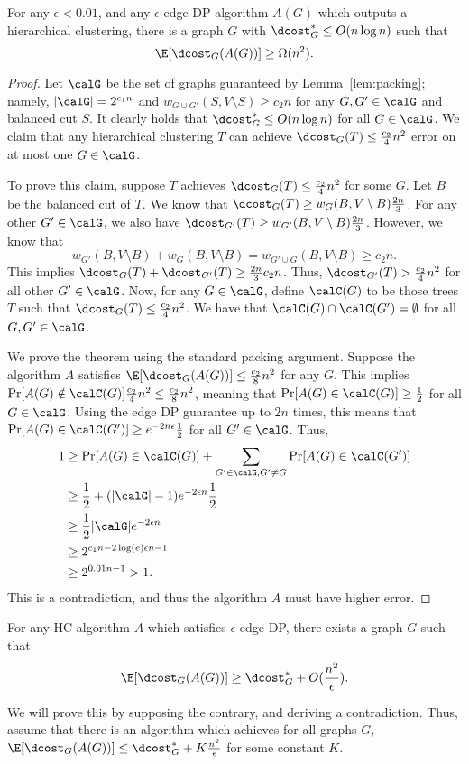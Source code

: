 \begin{thm}
For any $\epsilon < 0.01$, and any $\epsilon$-edge DP algorithm $A(G)$ which outputs a hierarchical clustering, there is a graph $G$ with $\dcost_G^* \leq O(n \log n)$ such that 
\[
    \E[\dcost_{G}(A(G))] \geq \Omega(n^2).
\]
\end{thm}
\begin{proof}
Let $\calG$ be the set of graphs guaranteed by Lemma~\ref{lem:packing}; namely, $|\calG| = 2^{c_1n}$ and $w_{G \cup G'}(S, V\setminus S) \geq c_2 n$ for any $G, G' \in \calG$ and balanced cut $S$. It clearly holds that $\dcost_G^* \leq O(n \log n)$ for all $G \in \calG$. We claim that any hierarchical clustering $T$ can achieve $\dcost_G(T) \leq \frac{c_2}{4}n^2$ error on at most one $G \in \calG$.

To prove this claim, suppose $T$ achieves $\dcost_G(T) \leq \frac{c_2}{4}n^2$ for some $G$. Let $B$ be the balanced cut of $T$. We know that $\dcost_G(T) \geq w_G(B, V \setminus B) \frac{2n}{3}$. For any other $G' \in \calG$, we also have $\dcost_{G'}(T) \geq w_{G'}(B, V \setminus B) \frac{2n}{3}$. However, we know that
\[
    w_{G'}(B, V \setminus B) + w_{G}(B, V \setminus B) = w_{G' \cup G}(B, V \setminus B) \geq c_2 n.
\]
This implies $\dcost_{G}(T) + \dcost_{G'}(T) \geq \frac{2n}{3}c_2 n$. Thus, $\dcost_{G'}(T) > \frac{c_2}{4}n^2$ for all other $G' \in \calG$. Now, for any $G \in \calG$, define $\calC(G)$ to be those trees $T$ such that $\dcost_G(T) \leq \frac{c_2}{4}n^2$. We have that $\calC(G) \cap \calC(G') = \emptyset$ for all $G,G' \in \calG$.

We prove the theorem using the standard packing argument. Suppose the algorithm $A$ satisfies $\E[\dcost_G(A(G))] \leq \frac{c_2}{8}n^2$ for any $G$. This implies $\Pr[A(G) \notin \calC(G)] \frac{c_2}{4} n^2 \leq \frac{c_2}{8}n^2$, meaning that $\Pr[A(G) \in \calC(G)] \geq \frac{1}{2}$ for all $G \in \calG$. Using the edge DP guarantee up to $2n$ times, this means that $\Pr[A(G) \in \calC(G')] \geq e^{-2n\epsilon} \frac{1}{2}$ for all $G' \in \calG$. Thus,
\begin{align*}
    1 &\geq \Pr[A(G) \in \calC(G)] + \sum_{G' \in \calG, G' \neq G} \Pr[A(G) \in \calC(G')] \\
    &\geq \frac{1}{2} +  (|\calG|-1)e^{-2\epsilon n} \frac{1}{2} \\
    &\geq \frac{1}{2}|\calG|e^{-2\epsilon n} \\
    &\geq 2^{c_1 n - 2\log(e)\epsilon n-1} \\
    &\geq 2^{0.01 n - 1} > 1.
\end{align*}
This is a contradiction, and thus the algorithm $A$ must have higher error.
\end{proof}
\iffalse
\begin{thm}
    For any HC algorithm $A$ which satisfies $\epsilon$-edge DP, there exists a graph $G$ such that
    \[
        \E[\dcost_G(A(G))] \geq \dcost_G^* + O(\frac{n^2}{\epsilon}).
    \]
\end{thm}
We will prove this by supposing the contrary, and deriving a contradiction. Thus, assume that there is an algorithm which achieves for all graphs $G$, $\E[\dcost_G(A(G))] \leq \dcost_G^* + K \frac{n^2}{\epsilon}$ for some constant $K$.


